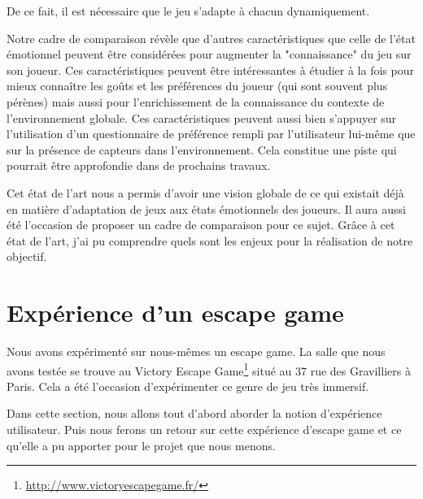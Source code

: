 \documentclass{article}
\begin{document}
		De ce fait, il est nécessaire que le jeu s'adapte à chacun dynamiquement.\par
		Notre cadre de comparaison révèle que d'autres caractéristiques que celle de l'état émotionnel peuvent être considérées pour augmenter la "connaissance" du jeu sur son joueur.
		Ces caractéristiques peuvent être intéressantes à étudier à la fois pour mieux connaître les goûts et les préférences du joueur (qui sont souvent plus pérènes) mais aussi pour l'enrichissement de la connaissance du contexte de l'environnement globale. 
		Ces caractéristiques peuvent aussi bien s'appuyer sur l'utilisation d'un questionnaire de préférence rempli par l'utilisateur lui-même que sur la présence de capteurs dans l'environnement. 
		Cela constitue une piste qui pourrait être approfondie dans de prochains travaux.\par
		Cet état de l'art nous a permis d'avoir une vision globale de ce qui existait déjà en matière d'adaptation de jeux aux états émotionnels des joueurs.
		Il aura aussi été l'occasion de proposer un cadre de comparaison pour ce sujet. 
		Grâce à cet état de l'art, j'ai pu comprendre quels sont les enjeux pour la réalisation de notre objectif.

\section{Expérience d'un escape game}\label{sec:escape}
	Nous avons expérimenté sur nous-mêmes un escape game.
	La salle que nous avons testée se trouve au Victory Escape Game\footnote{\href{http://www.victoryescapegame.fr/}{http://www.victoryescapegame.fr/}} situé au 37 rue des Gravilliers à Paris.
	Cela a été l'occasion d'expérimenter ce genre de jeu très immersif.\par
	Dans cette section, nous allons tout d'abord aborder la notion d'expérience utilisateur.
	Puis nous ferons un retour sur cette expérience d'escape game et ce qu'elle a pu apporter pour le projet que nous menons.
\end{document}
